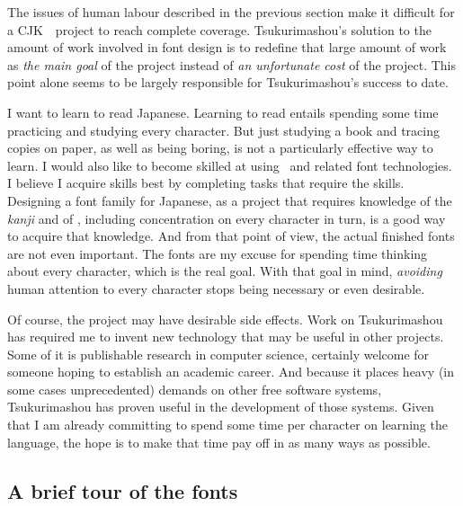 \documentclass{ltugboat}
\def\CJK{CJK}
\begin{document}
The issues of human labour described in the previous section make it
difficult for a \CJK\ \MF\ project to reach complete coverage. 
Tsukurimashou's solution to the amount of work involved in font design is to
redefine that large amount of work as \emph{the main goal} of the project
instead of \emph{an unfortunate cost} of the project.  This point alone
seems to be largely responsible for Tsukurimashou's success to date.

I want to learn to read Japanese.  Learning to read entails spending some
time practicing and studying every character.  But just studying a book and
tracing copies on paper, as well as being boring, is not a particularly
effective way to learn.  I would also like to become skilled at using \MF\
and related font technologies.  I believe I acquire skills best by
completing tasks that require the skills.  Designing a font family for
Japanese, as a project that requires knowledge of the \emph{kanji} and of \MF,
including concentration on every character in turn, is a good way to acquire
that knowledge.  And from that point of view, the actual finished fonts are
not even important.  The fonts are my excuse for spending time thinking
about every character, which is the real goal.  With that goal in mind,
\emph{avoiding} human attention to every character stops being necessary or
even desirable.

Of course, the project may have desirable side effects.  Work on
Tsukurimashou has required me to invent new technology that may be useful in
other projects.  Some of it is publishable research in computer science,
certainly welcome for someone hoping to establish an academic career.  And
because it places heavy (in some cases unprecedented) demands on other free
software systems, Tsukurima\-shou has proven useful in the development of
those systems.  Given that I am already committing to spend some time per
character on learning the language, the hope is to make that time pay off in
as many ways as possible.

\subsection{A brief tour of the fonts}
\end{document}
